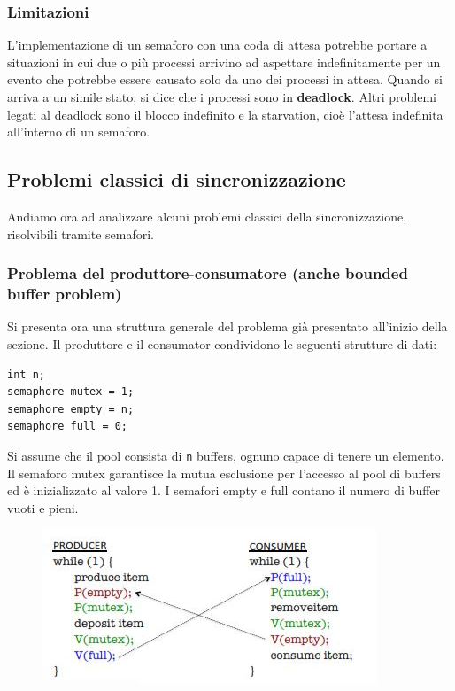 \documentclass[a4paper]{article}
\begin{document}
\subsubsection{Limitazioni}
L'implementazione di un semaforo con una coda di attesa potrebbe portare a situazioni in cui due o più processi arrivino ad aspettare indefinitamente per un evento che potrebbe essere causato solo da uno dei processi in attesa. Quando si arriva a un simile stato, si dice che i processi sono in \textbf{deadlock}. Altri problemi legati al deadlock sono il blocco indefinito e la starvation, cioè l'attesa indefinita all'interno di un semaforo.

\subsection{Problemi classici di sincronizzazione}
Andiamo ora ad analizzare alcuni problemi classici della sincronizzazione, risolvibili tramite semafori.

\subsubsection{Problema del produttore-consumatore (anche bounded buffer problem)}
Si presenta ora una struttura generale del problema già presentato all'inizio della sezione. Il produttore e il consumator condividono le seguenti strutture di dati:
\begin{verbatim}
int n;
semaphore mutex = 1;
semaphore empty = n;
semaphore full = 0;
\end{verbatim}

Si assume che il pool consista di \texttt n buffers, ognuno capace di tenere un elemento. Il semaforo mutex garantisce la mutua esclusione per l'accesso al pool di buffers ed è inizializzato al valore 1. I semafori empty e full contano il numero di buffer vuoti e pieni.
\begin{figure}[htb]
    \includegraphics{img/sem_prod_cons.JPG}
\end{figure}
\end{document}
